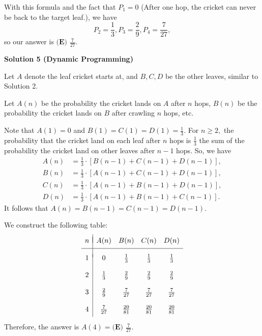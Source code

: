 \begin{enumerate}
 With this formula and the fact that $P_1=0$ (After one hop, the cricket can never be back to the target leaf.), we have 
 \[P_2 = \frac13, P_3 = \frac29, P_4 = \frac7{27},\] so our answer is $\boxed{\textbf{(E) }\frac{7}{27}}$.

 



\textbf{Solution 5 (Dynamic Programming)}

Let $A$ denote the leaf cricket starts at, and $B, C, D$ be the other leaves, similar to Solution 2.

 Let $A(n)$ be the probability the cricket lands on $A$ after $n$ hops, $B(n)$ be the probability the cricket lands on $B$ after crawling $n$ hops, etc.

 Note that $A(1)=0$ and $B(1)=C(1)=D(1)=\frac13.$ For $n\geq2,$ the probability that the cricket land on each leaf after $n$ hops is $\frac13$ the sum of the probability the cricket land on other leaves after $n-1$ hops. So, we have
 \begin{align*} A(n) &= \frac13 \cdot [B(n-1) + C(n-1) + D(n-1)], \\ B(n) &= \frac13 \cdot [A(n-1) + C(n-1) + D(n-1)], \\ C(n) &= \frac13 \cdot [A(n-1) + B(n-1) + D(n-1)], \\ D(n) &= \frac13 \cdot [A(n-1) + B(n-1) + C(n-1)]. \end{align*}
It follows that $A(n) = B(n-1) = C(n-1) = D(n-1).$

 We construct the following table:
 \[\begin{array}{c|cccc}  &  &  &  & \\ [-2ex] n & A(n) & B(n) & C(n) & D(n) \\ [1ex] \hline  &  &  &  & \\ [-1ex] 1 & 0 & \frac13 & \frac13 & \frac13 \\  &  &  &  & \\ 2 & \frac13 & \frac29 & \frac29 & \frac29 \\  &  &  &  & \\ 3 & \frac29 & \frac{7}{27} & \frac{7}{27} & \frac{7}{27} \\  &  &  &  & \\ 4 & \frac{7}{27} & \frac{20}{81} & \frac{20}{81} & \frac{20}{81} \\ [1ex] \end{array}\]Therefore, the answer is $A(4)=\boxed{\textbf{(E) }\frac{7}{27}}$.

 




\end{enumerate}

